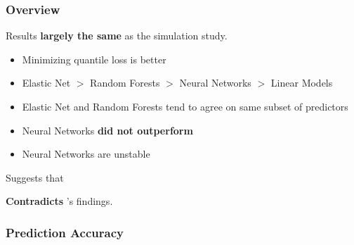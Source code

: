 \documentclass[aspectratio=169]{beamer}
\begin{document}
\begin{frame}
\frametitle{Overview}

Results \textbf{largely the same} as the simulation study.

\begin{itemize}
	\item Minimizing quantile loss is better
	\item Elastic Net $>$ Random Forests $>$ Neural Networks $>$ Linear Models
	\item Elastic Net and Random Forests tend to agree on same subset of predictors
	\item Neural Networks \textbf{did not outperform}
	\item Neural Networks are unstable
\end{itemize}

Suggests that 

\textbf{Contradicts} \cite{gu_empirical_2018}'s findings.

\end{frame}


\subsubsection{Prediction Accuracy}



\end{document}
